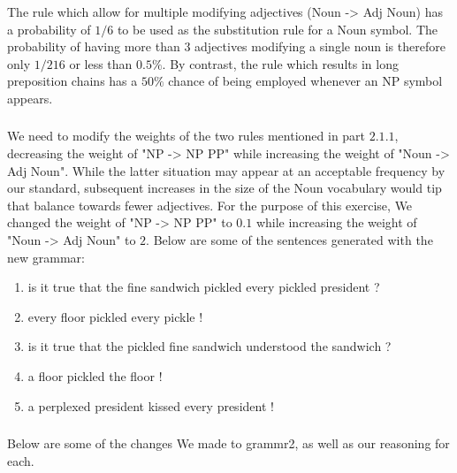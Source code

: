 \documentclass[11pt]{article}
\begin{document}
\subsubsection{}

\noindent The rule which allow for multiple modifying adjectives (Noun -> Adj Noun) has a probability of $1/6$ to be used as the substitution rule for a Noun symbol. The probability of having more than $3$ adjectives modifying a single noun is therefore only $1/216$ or less than $0.5\%$. By contrast, the rule which results in long preposition chains has a $50\%$ chance of being employed whenever an NP symbol appears.

\subsubsection{}

\noindent We need to modify the weights of the two rules mentioned in part $2.1.1$, decreasing the weight of "NP -> NP PP" while increasing the weight of "Noun -> Adj Noun". While the latter situation may appear at an acceptable frequency by our standard, subsequent increases in the size of the Noun vocabulary would tip that balance towards fewer adjectives. For the purpose of this exercise, We changed the weight of "NP -> NP PP" to $0.1$ while increasing the weight of "Noun -> Adj Noun" to $2$. Below are some of the sentences generated with the new grammar:

\begin{enumerate}[label=(\arabic*)]
      \item is it true that the fine sandwich pickled every pickled president ?
      \item every floor pickled every pickle !
      \item is it true that the pickled fine sandwich understood the sandwich ?
      \item a floor pickled the floor !
      \item a perplexed president kissed every president !
\end{enumerate}

\subsubsection{}

\noindent Below are some of the changes We made to grammr2, as well as our reasoning for each.
\end{document}
